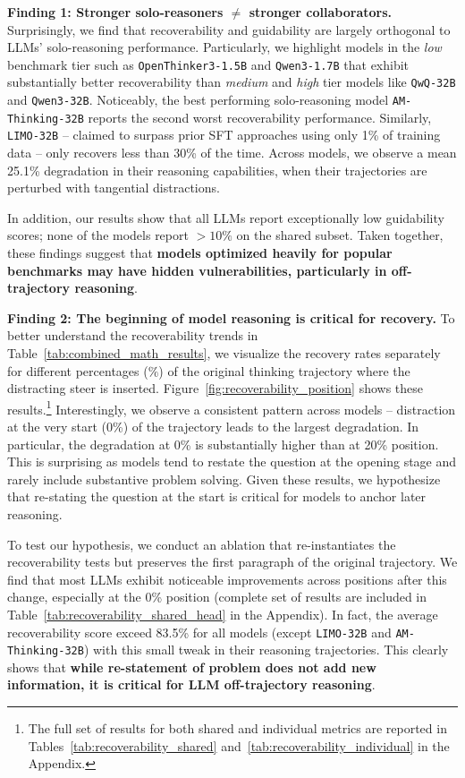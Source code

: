 \documentclass{article} %
\begin{document}
\textbf{Finding 1: Stronger solo-reasoners $\ne$ stronger collaborators.} Surprisingly, we find that recoverability and guidability are largely orthogonal to LLMs' solo-reasoning performance. Particularly, we highlight models in the \textit{low} benchmark tier such as \texttt{OpenThinker3-1.5B}  and \texttt{Qwen3-1.7B} that exhibit substantially better recoverability than \textit{medium} and \textit{high} tier models like \texttt{QwQ-32B} and \texttt{Qwen3-32B}. Noticeably, the best performing solo-reasoning model \texttt{AM-Thinking-32B} reports the second worst recoverability performance. Similarly, \texttt{LIMO-32B} -- claimed to surpass prior SFT approaches using only 1\% of training data -- only recovers less than 30\% of the time. Across models, we observe a mean 25.1\% degradation in their reasoning capabilities, when their trajectories are perturbed with tangential distractions. 

In addition, our results show that all LLMs report exceptionally low guidability scores; none of the models report $\!>\!10\%$ on the shared subset. Taken together, these findings suggest that \textbf{models optimized heavily for popular benchmarks may have hidden vulnerabilities, particularly in off-trajectory reasoning}.


\textbf{Finding 2: The beginning of model reasoning is critical for recovery.} To better understand the recoverability trends in Table~\ref{tab:combined_math_results}, 
we visualize the recovery rates separately for different percentages ($\%$) of the original thinking trajectory where the distracting steer is inserted. Figure~\ref{fig:recoverability_position} shows these results.\footnote{The full set of results for both shared and individual metrics are reported in Tables~\ref{tab:recoverability_shared} and~\ref{tab:recoverability_individual} in the Appendix.} Interestingly, we observe a consistent pattern across models -- distraction at the very start (0\%) of the trajectory leads to the largest degradation. In particular, the degradation at 0\% is substantially higher than at 20\% position. This is surprising as models tend to restate the question at the opening stage and rarely include substantive problem solving. Given these results, we hypothesize that re-stating the question at the start is critical for models to anchor later reasoning.

To test our hypothesis, we conduct an ablation that re-instantiates the recoverability tests but preserves the first paragraph of the original trajectory. We find that most LLMs exhibit noticeable improvements across positions after this change, especially at the 0\% position (complete set of results are included in Table~\ref{tab:recoverability_shared_head} in the Appendix). In fact, the average recoverability score exceed 83.5\%  for all models (except \texttt{LIMO-32B} and \texttt{AM-Thinking-32B}) with this small tweak in their reasoning trajectories. This clearly shows that \textbf{while re-statement of problem does not add new information, it is critical for LLM off-trajectory reasoning}. 
\end{document}
